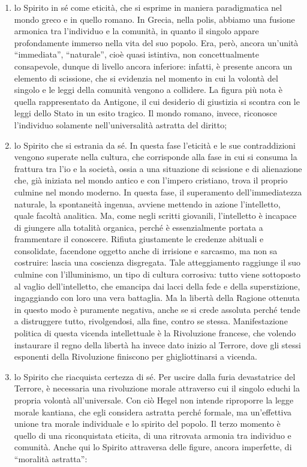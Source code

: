 \documentclass[a4paper,12pt,oneside,openany]{book}%
\begin{document}
\begin{enumerate}
	\item lo Spirito in sé come eticità, che si esprime in maniera paradigmatica nel mondo greco e in quello romano. In Grecia, nella polis, abbiamo una fusione armonica tra l’individuo e la comunità, in quanto il singolo appare profondamente immerso nella vita del suo popolo. Era, però, ancora un’unità “immediata”, “naturale”, cioè quasi istintiva, non concettualmente consapevole, dunque di livello ancora inferiore: infatti, è presente ancora un elemento di scissione, che si evidenzia nel momento in cui la volontà del singolo e le leggi della comunità vengono a collidere. La figura più nota è quella rappresentato da Antigone, il cui desiderio di giustizia si scontra con le leggi dello Stato in un esito tragico. Il mondo romano, invece, riconosce l’individuo solamente nell’universalità astratta del diritto;
	
	\item lo Spirito che si estrania da sé. In questa fase l’eticità e le sue contraddizioni vengono superate nella cultura, che corrisponde alla fase in cui si consuma la frattura tra l’io e la società, ossia a una situazione di scissione e di alienazione che, già iniziata nel mondo antico e con l’impero cristiano, trova il proprio culmine nel mondo moderno. In questa fase, il superamento dell’immediatezza naturale, la spontaneità ingenua, avviene mettendo in azione l’intelletto, quale facoltà analitica. Ma, come negli scritti giovanili, l’intelletto è incapace di giungere alla totalità organica, perché è essenzialmente portata a frammentare il conoscere. Rifiuta giustamente le credenze abituali e consolidate, facendone oggetto anche di irrisione e sarcasmo, ma non sa costruire: lascia una coscienza disgregata. Tale atteggiamento raggiunge il suo culmine con l’illuminismo, un tipo di cultura corrosiva: tutto viene sottoposto al vaglio dell’intelletto, che emancipa dai lacci della fede e della superstizione, ingaggiando con loro una vera battaglia. Ma la libertà della Ragione ottenuta in questo modo è puramente negativa, anche se si crede assoluta perché tende a distruggere tutto, rivolgendosi, alla fine, contro se stessa. Manifestazione politica di questa vicenda intellettuale è la Rivoluzione francese, che volendo instaurare il regno della libertà ha invece dato inizio al Terrore, dove gli stessi esponenti della Rivoluzione finiscono per ghigliottinarsi a vicenda.
	\item lo Spirito che riacquista certezza di sé. Per uscire dalla furia devastatrice del Terrore, è necessaria una rivoluzione morale attraverso cui il singolo educhi la propria volontà all’universale. Con ciò Hegel non intende riproporre la legge morale kantiana, che egli considera astratta perché formale, ma un’effettiva unione tra morale individuale e lo spirito del popolo. Il terzo momento è quello di una riconquistata eticita, di una ritrovata armonia tra individuo e comunità. Anche qui lo Spirito attraversa delle figure, ancora imperfette, di “moralità astratta”:
	

\end{enumerate}
\end{document}
